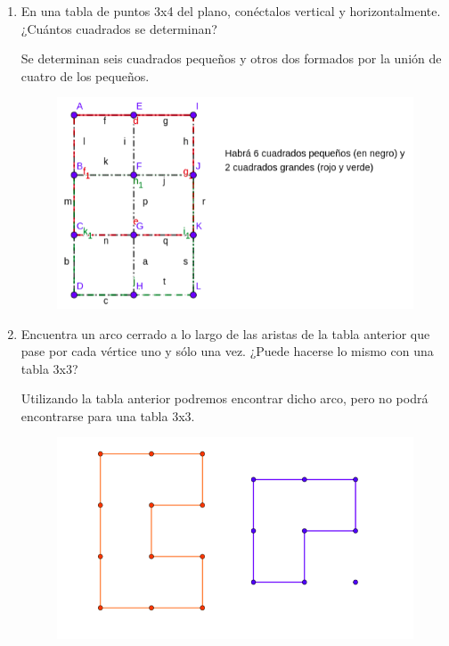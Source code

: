 \begin{enumerate}
	\item En una tabla de puntos 3x4 del plano, conéctalos vertical y horizontalmente. ¿Cuántos cuadrados se determinan?
	
	Se determinan seis cuadrados pequeños y otros dos formados por la unión de cuatro de los pequeños.
	
	\begin{figure}[H]
		\centering
		\includegraphics[scale=0.5]{images/grafos_poligonos_poliedros/a1.png}
	\end{figure}
	
	
	\item Encuentra un arco cerrado a lo largo de las aristas de la tabla anterior que pase por cada vértice uno y sólo una vez. ¿Puede hacerse lo mismo con una tabla 3x3?
	
	Utilizando la tabla anterior podremos encontrar dicho arco, pero no podrá encontrarse para una tabla 3x3.
	
	\begin{figure}[H]
		\centering
		\includegraphics[scale=0.5]{images/grafos_poligonos_poliedros/a1_1.png}
	\end{figure}
	

\end{enumerate}
